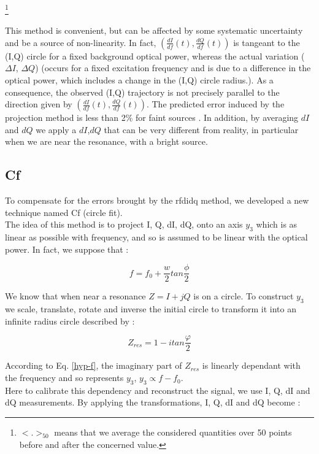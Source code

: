 \footnote{$<.>_{50}$ means that we average the considered quantities over 50 points before and after the concerned value.}

This method is convenient, but can be affected by some systematic uncertainty and be a source of non-linearity. In fact, $(\frac{dI}{df}(t),\frac{dQ}{df}(t))$ is tangeant to the (I,Q) circle for a fixed background optical power, whereas the actual variation ($\Delta I$, $\Delta Q$) (occurs for a fixed excitation frequency and is due to a difference in the optical power, which includes a change in the (I,Q) circle radius.). As a consequence, the observed (I,Q) trajectory is not precisely parallel to the direction given by $(\frac{dI}{df}(t),\frac{dQ}{df}(t))$. The predicted error induced by the projection method is less than 2\% for faint sources \citep{2013A&A...551L..12C}. In addition, by averaging $dI$ and $dQ$ we apply a $dI$,$dQ$ that can be very different from reality, in particular when we are near the resonance, with a bright source.\\

\subsection{Cf}
To compensate for the errors brought by the rfdidq method, we developed a new technique named Cf (circle fit).\\
The idea of this method is to project I, Q, dI, dQ, onto an axis $y_{3}$ which is as linear as possible with frequency, and so is assumed to be linear with the optical power. In fact, we suppose that :

\begin{equation}
\label{hyp-f}
f = f_{0} + \frac{w}{2} tan\frac{\phi}{2}
\end{equation}

We know that when near a resonance $Z = I+jQ$ is on a circle. To construct $y_{3}$ we scale, translate, rotate and inverse the initial circle to transform it into an infinite radius circle described by :

\begin{equation}
\label{Zres}
Z_{res} = 1 - i tan\frac{\varphi}{2}
\end{equation}

According to Eq. \ref{hyp-f}, the imaginary part of $Z_{res}$ is linearly dependant with the frequency and so represents $y_{3}$, $y_{3} \propto f - f_{0}$.\\
Here to calibrate this dependency and reconstruct the signal, we use I, Q, dI and dQ measurements. By applying the transformations, I, Q, dI and dQ become : 

